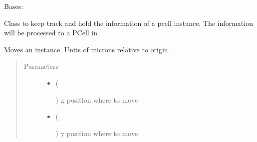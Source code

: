 \documentclass[a4paper,10pt,english]{sphinxmanual}
\begin{document}
\begin{fulllineitems}
\label{\detokenize{photonics:kppc.photonics.InstanceHolder}}
Bases: %
\begin{footnote}[12]\sphinxAtStartFootnote
{}
%
\end{footnote}

Class to keep track and hold the information of a pcell instance. The information will be processed to a PCell in
{\hyperref[\detokenize{photonics:kppc.photonics.PhotDevice.produce_impl}]{}}

\begin{fulllineitems}
\label{\detokenize{photonics:kppc.photonics.InstanceHolder.move}}
Moves an instance. Units of microns relative to origin.
\begin{quote}\begin{description}
\item[{Parameters}] \leavevmode\begin{itemize}
\item {} 
 (%
\begin{footnote}[13]\sphinxAtStartFootnote
{}
%
\end{footnote}) \textendash{} x position where to move

\item {} 
 (%
\begin{footnote}[14]\sphinxAtStartFootnote
{}
%
\end{footnote}) \textendash{} y position where to move


\end{itemize}
\end{description}
\end{quote}
\end{fulllineitems}
\end{fulllineitems}
\end{document}
